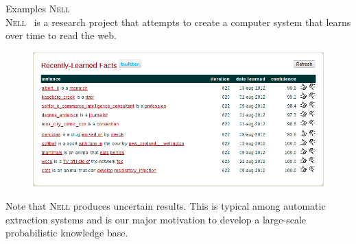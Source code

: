 \documentclass[onlymath,xcolor=pdftex,dvipsnames,table]{beamer}
\newcommand{\nell}{\textsc{Nell}\xspace}
\newcommand{\head}[1]{{\large\color{OliveGreen}#1\\[2pt]}}
\begin{document}
\begin{frame}{Examples}
\head{\nell}
\nell~\cite{carlson2010toward} is a research project that attempts to create a computer system that learns over time to read the web.
\begin{figure}
  \centering
  \includegraphics[width=.6\textwidth]{nell.png}
\end{figure}
Note that \nell produces uncertain results. This is typical among automatic extraction systems and is our major motivation to develop a large-scale probabilistic knowledge base.
\end{frame}
\end{document}
